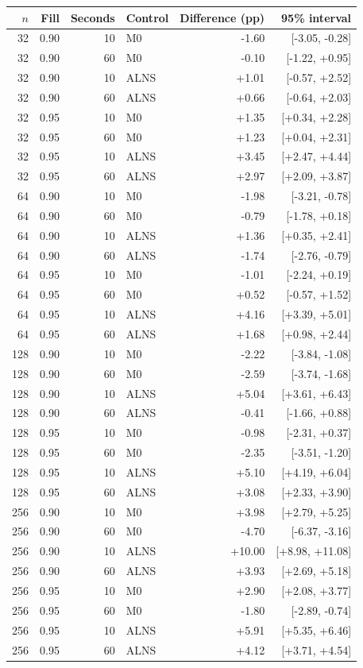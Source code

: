 \begin{tabular}{rrrlrr}
\toprule
$n$ & Fill & Seconds & Control & Difference (pp) & 95\% interval \\
\midrule
32 & 0.90 & 10 & M0 & -1.60 & [-3.05, -0.28] \\
32 & 0.90 & 60 & M0 & -0.10 & [-1.22, +0.95] \\
32 & 0.90 & 10 & ALNS & +1.01 & [-0.57, +2.52] \\
32 & 0.90 & 60 & ALNS & +0.66 & [-0.64, +2.03] \\
32 & 0.95 & 10 & M0 & +1.35 & [+0.34, +2.28] \\
32 & 0.95 & 60 & M0 & +1.23 & [+0.04, +2.31] \\
32 & 0.95 & 10 & ALNS & +3.45 & [+2.47, +4.44] \\
32 & 0.95 & 60 & ALNS & +2.97 & [+2.09, +3.87] \\
64 & 0.90 & 10 & M0 & -1.98 & [-3.21, -0.78] \\
64 & 0.90 & 60 & M0 & -0.79 & [-1.78, +0.18] \\
64 & 0.90 & 10 & ALNS & +1.36 & [+0.35, +2.41] \\
64 & 0.90 & 60 & ALNS & -1.74 & [-2.76, -0.79] \\
64 & 0.95 & 10 & M0 & -1.01 & [-2.24, +0.19] \\
64 & 0.95 & 60 & M0 & +0.52 & [-0.57, +1.52] \\
64 & 0.95 & 10 & ALNS & +4.16 & [+3.39, +5.01] \\
64 & 0.95 & 60 & ALNS & +1.68 & [+0.98, +2.44] \\
128 & 0.90 & 10 & M0 & -2.22 & [-3.84, -1.08] \\
128 & 0.90 & 60 & M0 & -2.59 & [-3.74, -1.68] \\
128 & 0.90 & 10 & ALNS & +5.04 & [+3.61, +6.43] \\
128 & 0.90 & 60 & ALNS & -0.41 & [-1.66, +0.88] \\
128 & 0.95 & 10 & M0 & -0.98 & [-2.31, +0.37] \\
128 & 0.95 & 60 & M0 & -2.35 & [-3.51, -1.20] \\
128 & 0.95 & 10 & ALNS & +5.10 & [+4.19, +6.04] \\
128 & 0.95 & 60 & ALNS & +3.08 & [+2.33, +3.90] \\
256 & 0.90 & 10 & M0 & +3.98 & [+2.79, +5.25] \\
256 & 0.90 & 60 & M0 & -4.70 & [-6.37, -3.16] \\
256 & 0.90 & 10 & ALNS & +10.00 & [+8.98, +11.08] \\
256 & 0.90 & 60 & ALNS & +3.93 & [+2.69, +5.18] \\
256 & 0.95 & 10 & M0 & +2.90 & [+2.08, +3.77] \\
256 & 0.95 & 60 & M0 & -1.80 & [-2.89, -0.74] \\
256 & 0.95 & 10 & ALNS & +5.91 & [+5.35, +6.46] \\
256 & 0.95 & 60 & ALNS & +4.12 & [+3.71, +4.54] \\
\bottomrule
\end{tabular}
